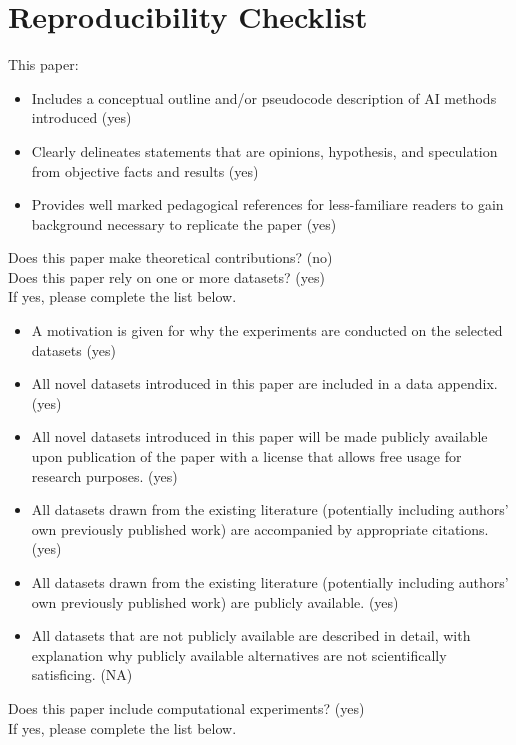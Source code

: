 \documentclass[letterpaper]{article} %
\begin{document}
\section{Reproducibility Checklist}
This paper:
\begin{itemize}
    \item Includes a conceptual outline and/or pseudocode description of AI methods introduced (yes)
    \item Clearly delineates statements that are opinions, hypothesis, and speculation from objective facts and results (yes)
    \item Provides well marked pedagogical references for less-familiare readers to gain background necessary to replicate the paper (yes)
\end{itemize}\leavevmode
Does this paper make theoretical contributions? (no) \\
Does this paper rely on one or more datasets? (yes) \\
If yes, please complete the list below.
\begin{itemize}
    \item A motivation is given for why the experiments are conducted on the selected datasets (yes)
    \item All novel datasets introduced in this paper are included in a data appendix. (yes)
    \item All novel datasets introduced in this paper will be made publicly available upon publication of the paper with a license that allows free usage for research purposes. (yes)
    \item All datasets drawn from the existing literature (potentially including authors’ own previously published work) are accompanied by appropriate citations. (yes)
    \item All datasets drawn from the existing literature (potentially including authors’ own previously published work) are publicly available. (yes)
    \item All datasets that are not publicly available are described in detail, with explanation why publicly available alternatives are not scientifically satisficing. (NA)
\end{itemize}\leavevmode
Does this paper include computational experiments? (yes) \\
If yes, please complete the list below. 
\end{document}

